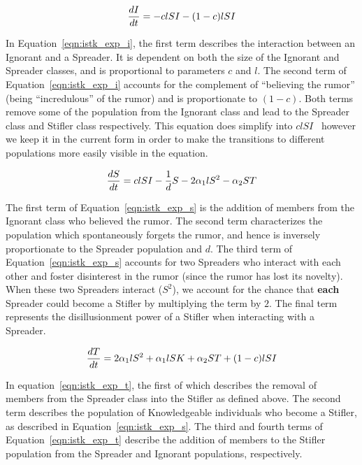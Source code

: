\begin{equation}
\label{eqn:istk_exp_i}
\frac{dI}{dt}  = - clSI - (1-c)lSI \\
\end{equation}

In Equation~\ref{eqn:istk_exp_i}, the first term describes the interaction between an Ignorant and a Spreader.
It is dependent on both the size of the Ignorant and Spreader classes, and is proportional to parameters $ c $ and $ l $.
 The second term of Equation~\ref{eqn:istk_exp_i} accounts for the complement of ``believing the rumor'' (being ``incredulous'' of the rumor) and is proportionate to $ (1 - c) $.
Both terms remove some of the population from the Ignorant class and lead to the Spreader class and Stifler class respectively.
This equation does simplify into $ clSI $ \, however we keep it in the current form in order to make the transitions to different populations more easily visible in the equation.

\begin{equation}
\label{eqn:istk_exp_s} \frac{dS}{dt} = clSI - \frac{1}{d} S - 2 \alpha_1l S^2 - \alpha_2 ST \\
\end{equation}

The first term of Equation~\ref{eqn:istk_exp_s} is the addition of members from the Ignorant class who believed the rumor.
The second term characterizes the population which spontaneously forgets the rumor, and hence is inversely proportionate to the Spreader population and $ d $.
The third term of Equation~\ref{eqn:istk_exp_s} accounts for two Spreaders who interact with each other and foster disinterest in the rumor (since the rumor has lost its novelty).
When these two Spreaders interact ($S^2$), we account for the chance that \textbf{each} Spreader could become a Stifler by multiplying the term by $ 2 $.
The final term represents the disillusionment power of a Stifler when interacting with a Spreader.

\begin{equation}
\label{eqn:istk_exp_t} \frac{dT}{dt} =  2 \alpha_1l S^2 + \alpha_1l SK + \alpha_2 ST + (1-c)lSI \\
\end{equation}

In equation~\ref{eqn:istk_exp_t}, the first of which describes the removal of members from the Spreader class into the Stifler as defined above.
The second term describes the population of Knowledgeable individuals who become a Stifler, as described in Equation~\ref{eqn:istk_exp_s}.
The third and fourth terms of Equation~\ref{eqn:istk_exp_t} describe the addition of members to the Stifler population from the Spreader and Ignorant populations, respectively.


